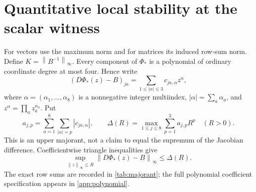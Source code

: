 \documentclass[11pt,a4paper]{article}
\numberwithin{equation}{section}
\theoremstyle{definition}
\theoremstyle{remark}
\newcommand{\norm}[1]{\left\lVert #1\right\rVert}
\begin{document}
\section{Quantitative local stability at the scalar witness}
\label{sec:stability}
For vectors use the maximum norm and for matrices its induced row-sum
norm. Define $K=\norm{B^{-1}}_\infty$. Every component of $\Phi_*$ is a
polynomial of ordinary coordinate degree at most four. Hence write
\begin{equation}\label{eq:derivative_poly}
 (D\Phi_*(z)-B)_{ja}
 =\sum_{1\leq|\alpha|\leq3} c_{ja,\alpha}z^\alpha,
\end{equation}
where $\alpha=(\alpha_1,\ldots,\alpha_8)$ is a nonnegative integer
multiindex, $|\alpha|=\sum_a\alpha_a$, and
$z^\alpha=\prod_a z_a^{\alpha_a}$. Put
\begin{equation}\label{eq:Delta}
 a_{j,p}=\sum_{a=1}^8\sum_{|\alpha|=p}|c_{ja,\alpha}|,
 \qquad
 \Delta(R)=\max_{1\leq j\leq8}\sum_{p=1}^3a_{j,p}R^p\quad(R>0).
\end{equation}
This is an upper majorant, not a claim to equal the supremum of the
Jacobian difference. Coefficientwise triangle inequalities give
\begin{equation}\label{eq:majorant}
 \sup_{\norm{z}_\infty\leq R}\norm{D\Phi_*(z)-B}_\infty\leq\Delta(R).
\end{equation}
The exact row sums are recorded in \cref{tab:majorant}; the full
polynomial coefficient specification appears in \cref{app:polynomial}.
\end{document}
